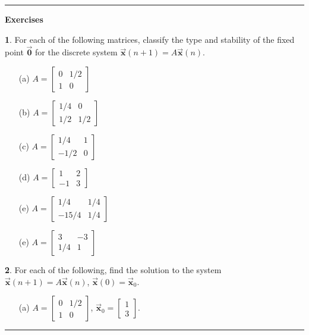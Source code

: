 \documentclass[reqno]{immbook}
\newcommand{\BX}{\vec{\textbf{x}}}
\newcommand{\BZero}{\vec{\textbf{0}}}  %
\newcommand{\ds}{\displaystyle}
\numberwithin{equation}{chapter}
\numberwithin{question}{section}
\numberwithin{theorem}{chapter}
\numberwithin{figure}{chapter}
\theoremstyle{definition}
\newtheorem{exercise}{}[section]
\newenvironment{exercises}%
{%
\medskip\hrule\medskip\noindent\textbf{Exercises}%
}%
{%
\medskip\hrule
}
\begin{document}
\begin{exercises}
\begin{exercise}
For each of the following matrices, classify the
type and stability of the fixed point $\BZero$
for the discrete system $\BX(n+1) = A\BX(n)$.
\begin{enumerate}
\item[(a)]
$\ds A  =  \begin{bmatrix}
              0 & 1/2 \\
              1 & 0
           \end{bmatrix}$
\item[(b)]
$\ds A  =  \begin{bmatrix}
              1/4 & 0 \\
              1/2 & 1/2
           \end{bmatrix}$
\item[(c)]
$\ds A  =  \begin{bmatrix}
              1/4 & 1 \\
              -1/2 & 0
           \end{bmatrix}$
\item[(d)]
$\ds A  =  \begin{bmatrix}
              1 & 2 \\
              -1 & 3
           \end{bmatrix}$
\item[(e)]
$\ds A  =  \begin{bmatrix}
              1/4 & 1/4 \\
              -15/4 & 1/4
           \end{bmatrix}$
\item[(e)]
$\ds A  =  \begin{bmatrix}
              3 & -3 \\
              1/4 & 1
           \end{bmatrix}$
\end{enumerate}
\end{exercise}
\begin{exercise}
For each of the following, find the solution to the
system $\BX(n+1)=A\BX(n)$, $\BX(0)=\BX_0$.
\begin{enumerate}
\item[(a)]
$\ds A  =  \begin{bmatrix}
              0 & 1/2 \\
              1 & 0
           \end{bmatrix}$, \hspace*{.25cm} 
$\ds \BX_0 = \begin{bmatrix} 1 \\ 3 \end{bmatrix}$.

\end{enumerate}
\end{exercise}
\end{exercises}
\end{document}
